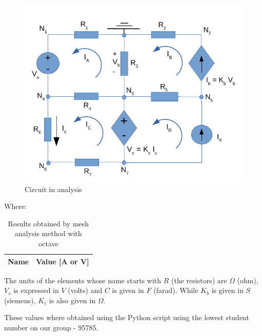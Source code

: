 \begin{figure}[H] \centering
\includegraphics[width=1\linewidth]{circuito.pdf}
\caption{Circuit in analysis}
\label{fig:circuito}
\end{figure}


\newpage

Where:
\begin{center}
\begin{table}[H]
 \centering
  \begin{tabular}{|c|c|}
    \hline    
    {\bf Name} & {\bf Value [A or V]} \\ \hline
    
  \end{tabular}
  \caption{Results obtained by mesh analysis method with octave}
  \label{tab:mesh}
\end{table}
\end{center}

The units of the elements whose name starts with $R$ (the resistors) are $\Omega$ (ohm), $V_s$ is expressed in $V$ (volts) and $C$ is given in $F$ (farad). While $K_b$ is given in $S$ (siemens), $K_c$ is also given in $\Omega$.

These values where obtained using the Python script using the lowest student number on our group - 95785.



